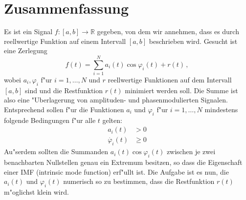 \documentclass[a4paper]{scrartcl}
\newcommand{\R}{{\mathbb{R}}}
\newcommand{\pphi}{{\varphi}}
\begin{document}

\section{Zusammenfassung}

Es ist ein Signal $f:[a,b]\to\R$ gegeben, von dem wir annehmen, dass es durch reellwertige Funktion auf einem Intervall $[a,b]$ beschrieben wird. 
Gesucht ist eine Zerlegung
$$ f(t) = \sum_{i=1}^N a_i(t)\cos\pphi_i(t) + r(t)\,, $$
wobei $a_i,\pphi_i$ f"ur $i=1,\dotsc,N$ und $r$ reellwertige Funktionen auf dem Intervall $[a,b]$ sind und die Restfunktion $r(t)$ minimiert werden soll. 
Die Summe ist also eine "Uberlagerung von amplituden- und phasenmodulierten Signalen. 
Entsprechend sollen f"ur die Funktionen $a_i$ und $\pphi_i$ f"ur $i=1,\dotsc,N$ mindestens folgende Bedingungen f"ur alle $t$ gelten:
\begin{align*}
  a_i(t) &> 0 \\
  \dot{\pphi_i}(t) &\ge 0
\end{align*}
Au"serdem sollten die Summanden $a_i(t)\cos\pphi_i(t)$ zwischen je zwei benachbarten Nullstellen genau ein Extremum besitzen, so dass die Eigenschaft einer IMF (intrinsic mode function) erf"ullt ist. 
Die Aufgabe ist es nun, die $a_i(t)$ und $\pphi_i(t)$ numerisch so zu bestimmen, dass die Restfunktion $r(t)$ m"oglichst klein wird. 




%
%
\end{document}
